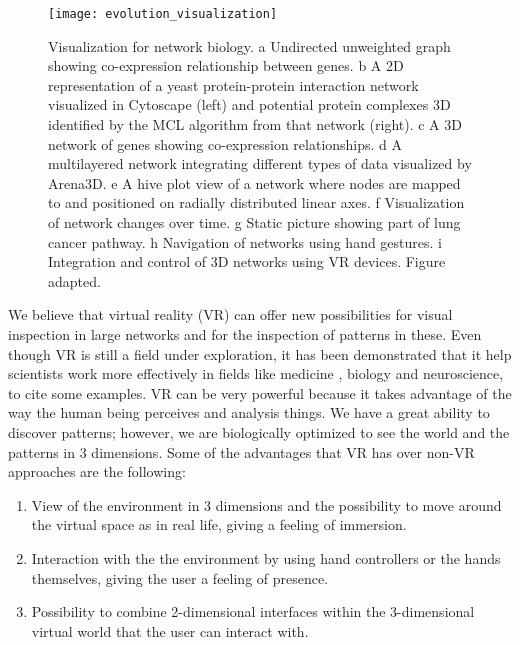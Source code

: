 \begin{figure}[h!]
    \newlength{\tempheight}
    \setlength{\tempheight}{15ex}
    \centering%
    \texttt{[image: evolution\_visualization]}
    \caption{Visualization for network biology. a Undirected unweighted graph showing co-expression relationship between genes. b A 2D representation of a yeast protein-protein interaction network visualized in Cytoscape (left) and potential protein complexes 3D identified by the MCL algorithm from that network (right). c A 3D network of genes showing co-expression relationships. d A multilayered network integrating different types of data visualized by Arena3D. e A hive plot view of a network where nodes are mapped to and positioned on radially distributed linear axes. f Visualization of network changes over time. g Static picture showing part of lung cancer pathway. h Navigation of networks using hand gestures. i Integration and control of 3D networks using VR devices. Figure adapted\cite{pavlopoulos_malliarakis_papanikolaou_theodosiou_enright_iliopoulos_2015}.}
    \label{fig:network_biology_evolution}
\end{figure}%

We believe that virtual reality (VR) can offer new possibilities for visual inspection in large networks and for the inspection of patterns in these. Even though VR is still a field under exploration, it has been demonstrated that it help scientists work more effectively in fields like medicine \cite{Laver11}\cite{xia_ip_samman_wong_gateno_wang_yeung_kot_tideman_2001}\cite{brain_damage_rehab}, biology\cite{10.1093/bioinformatics/bti581}\cite{thorley_lawson_duca_shapiro_2008} and neuroscience\cite{bohil_alicea_biocca_2011}\cite{minderer_harvey_donato_moser_2016}, to  cite some examples. VR can be very powerful because it takes advantage of the way the human being perceives and analysis things. We have a great ability to discover patterns; however, we are biologically optimized to see the world and the patterns in 3 dimensions. Some of the advantages that VR has over non-VR approaches are the following:

\begin{enumerate}
  \item View of the environment in 3 dimensions and the possibility to move around the virtual space as in real life, giving a feeling of immersion.
  \item Interaction with the the environment by using hand controllers or the hands themselves, giving the user a feeling of presence.
  \item Possibility to combine 2-dimensional interfaces within the 3-dimensional virtual world that the user can interact with.
\end{enumerate}

